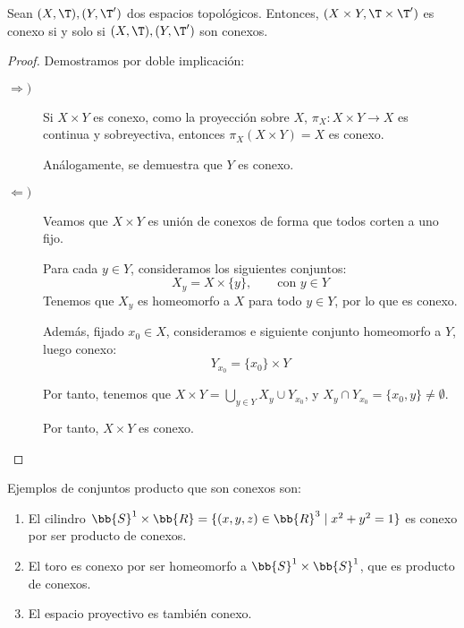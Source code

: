 \begin{prop}
    Sean $(X,\T), (Y,\T')$ dos espacios topológicos. Entonces, $(X\times Y, \T\times \T')$ es conexo si y solo si $(X,\T), (Y,\T')$ son conexos.
\end{prop}
\begin{proof}
    Demostramos por doble implicación:
    \begin{description}
        \item[$\Longrightarrow)$]
        Si $X\times Y$ es conexo, como la proyección sobre $X$, $\pi_X:X\times Y\to X$ es continua y sobreyectiva, entonces $\pi_X(X\times Y)=X$ es conexo.

        Análogamente, se demuestra que $Y$ es conexo.

        \item[$\Longleftarrow)$] Veamos que $X\times Y$ es unión de conexos de forma que todos corten a uno fijo.

        Para cada $y\in Y$, consideramos los siguientes conjuntos:
        \begin{equation*}
            X_y = X\times \{y\},\qquad \text{con } y\in Y
        \end{equation*}
        Tenemos que $X_y$ es homeomorfo a $X$ para todo $y\in Y$, por lo que es conexo.

        Además, fijado $x_0\in X$, consideramos e siguiente conjunto homeomorfo a $Y$, luego conexo:
        \begin{equation*}
            Y_{x_0} = \{x_0\}\times Y
        \end{equation*}

        Por tanto, tenemos que $X\times Y = \bigcup\limits_{y\in Y}X_y \cup Y_{x_0}$, y $X_y\cap Y_{x_0}=\{x_0,y\}\neq \emptyset$.

        Por tanto, $X\times Y$ es conexo.
    \end{description}
\end{proof}


\begin{ejemplo}
    Ejemplos de conjuntos producto que son conexos son:
    \begin{enumerate}
        \item El cilindro $\bb{S}^1\times \bb{R}=\{(x,y,z)\in \bb{R}^3\mid x^2 + y^2=1\}$ es conexo por ser producto de conexos.

        \item El toro es conexo por ser homeomorfo a $\bb{S}^1\times \bb{S}^1$, que es producto de conexos.

        \item El espacio proyectivo es también conexo.
    \end{enumerate}
\end{ejemplo}


